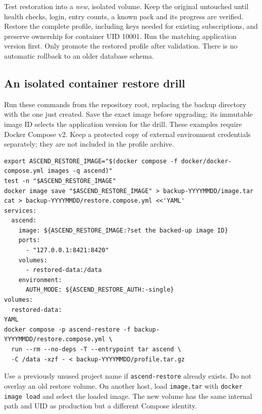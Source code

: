 Test restoration into a \emph{new}, isolated volume. Keep the original
untouched until health checks, login, entry counts, a known pack and its progress
are verified. Restore the complete profile, including keys needed for existing
subscriptions, and preserve ownership for container UID 10001. Run the matching
application version first. Only promote the restored profile after validation.
There is no automatic rollback to an older database schema.

\subsection{An isolated container restore drill}
Run these commands from the repository root, replacing the backup directory with
the one just created. Save the exact image before upgrading; its immutable image
ID selects the application version for the drill. These examples require Docker
Compose v2. Keep a protected copy of external environment credentials separately;
they are not included in the profile archive.
\begin{verbatim}
export ASCEND_RESTORE_IMAGE="$(docker compose -f docker/docker-compose.yml images -q ascend)"
test -n "$ASCEND_RESTORE_IMAGE"
docker image save "$ASCEND_RESTORE_IMAGE" > backup-YYYYMMDD/image.tar
cat > backup-YYYYMMDD/restore.compose.yml <<'YAML'
services:
  ascend:
    image: ${ASCEND_RESTORE_IMAGE:?set the backed-up image ID}
    ports:
      - "127.0.0.1:8421:8420"
    volumes:
      - restored-data:/data
    environment:
      AUTH_MODE: ${ASCEND_RESTORE_AUTH:-single}
volumes:
  restored-data:
YAML
docker compose -p ascend-restore -f backup-YYYYMMDD/restore.compose.yml \
  run --rm --no-deps -T --entrypoint tar ascend \
  -C /data -xzf - < backup-YYYYMMDD/profile.tar.gz
\end{verbatim}
Use a previously unused project name if \texttt{ascend-restore} already exists.
Do not overlay an old restore volume. On another host, load \texttt{image.tar}
with \texttt{docker image load} and select the loaded image. The new volume has
the same internal path and UID as production but a different Compose identity.

